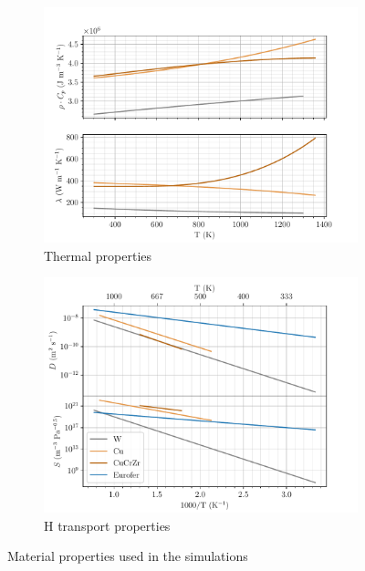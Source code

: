 \begin{figure}
    \centering
    \begin{subfigure}{0.75\linewidth}
        \centering
        \includegraphics[width=\linewidth]{Figures/Chapter3/monoblocks/interface_condition/iter case/thermal_prop.pdf}
        \caption{Thermal properties}
    \end{subfigure}
    \begin{subfigure}{0.75\linewidth}
        \centering
        \includegraphics[width=\linewidth]{Figures/Chapter3/monoblocks/interface_condition/H_properties.pdf}
        \caption{H transport properties}
    \end{subfigure}
    \caption{Material properties used in the simulations \cite{frauenfelder_solution_1969, reiter_compilation_1996, serra_hydrogen_1998, aiello_hydrogen_2002}}
    \label{fig:properties_1}
\end{figure}

